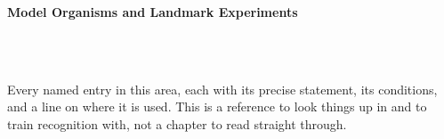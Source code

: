 



\makeindex[title={Index of This Volume},columns=2,intoc]

\begin{titlepage}\thispagestyle{empty}
\vspace*{0.14\textheight}
\noindent{\color{tiercat}\rule{\textwidth}{5pt}}\\[3pt]
\noindent{\color{bioline}\rule{\textwidth}{1pt}}\\[26pt]
\\[12pt]
\noindent\begin{minipage}{\textwidth}\raggedright
{\sffamily\bfseries\fontsize{28}{32}\selectfont\color{bioink}%
 \hyphenchar{} Model Organisms and Landmark Experiments\par}\end{minipage}\\[16pt]
\noindent{\color{biogreen}\rule{\textwidth}{1.4pt}}\\[10pt]
\noindent\begin{minipage}{\textwidth}\raggedright
{\fontsize{10.5}{14}\selectfont\color{biogreen}%
Every named entry in this area, each with its precise statement, its conditions, and a line on
where it is used. This is a reference to look things up in and to train recognition with, not a
chapter to read straight through.\par}\end{minipage}
\vfill
\noindent{\color{bioline}\rule{\textwidth}{1pt}}\\[3pt]
\noindent{\color{tiercat}\rule{\textwidth}{5pt}}
\end{titlepage}
\tableofcontents
\clearpage
{}
\clearpage
\printindex

